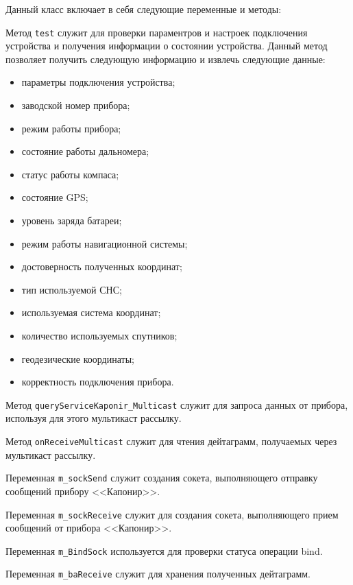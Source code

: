 Данный класс включает в себя следующие переменные и методы:
\begin{enum}
	\item Метод \texttt{test} служит для проверки параментров и настроек подключения устройства и получения
		информации о состоянии устройства. Данный метод позволяет получить следующую информацию и извлечь
		следующие данные:
		\begin{itemize}
			\item параметры подключения устройства;
			\item заводской номер прибора;
			\item режим работы прибора;
			\item состояние работы дальномера;
			\item статус работы компаса;
			\item состояние GPS;
			\item уровень заряда батареи;
			\item режим работы навигационной системы;
			\item достоверность полученных координат;
			\item тип используемой СНС;
			\item используемая система координат;
			\item количество используемых спутников;
			\item геодезические координаты;
			\item корректность подключения прибора.
		\end{itemize}

	\item Метод \texttt{queryServiceKaponir\_Multicast} служит для запроса данных от прибора, используя для этого
		мультикаст рассылку.

	\item Метод \texttt{onReceiveMulticast} служит для чтения дейтаграмм, получаемых через мультикаст рассылку.

	\item Переменная \texttt{m\_sockSend} служит создания сокета, выполняющего отправку сообщений прибору
		<<Капонир>>.

	\item Переменная \texttt{m\_sockReceive} служит для создания сокета, выполняющего прием сообщений от прибора
		<<Капонир>>.

	\item Переменная \texttt{m\_BindSock} используется для проверки статуса операции bind.

	\item Переменная \texttt{m\_baReceive} служит для хранения полученных дейтаграмм.
\end{enum}

